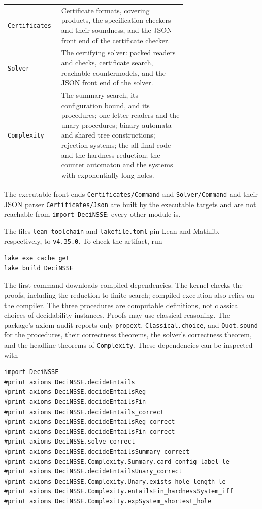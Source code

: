 \begin{center}
\begin{tabular}{@{}lp{0.70\linewidth}@{}}
\texttt{Certificates} & Certificate formats, covering products, the specification checkers and their soundness, and the JSON front end of the certificate checker.\\
\texttt{Solver} & The certifying solver: packed readers and checks, certificate search, reachable countermodels, and the JSON front end of the solver.\\
\texttt{Complexity} & The summary search, its configuration bound, and its procedures; one-letter readers and the unary procedures; binary automata and shared tree constructions; rejection systems; the all-final code and the hardness reduction; the counter automaton and the systems with exponentially long holes.\\\bottomrule
\end{tabular}
\end{center}
The executable front ends \texttt{Certificates/Command} and
\texttt{Solver/Command} and their JSON parser \texttt{Certificates/Json} are
built by the executable targets and are not reachable from
\texttt{import DeciNSSE}; every other module is.

The files \texttt{lean-toolchain} and \texttt{lakefile.toml} pin Lean and
Mathlib, respectively, to \texttt{v4.35.0}. To check the artifact, run
\begin{lstlisting}
lake exe cache get
lake build DeciNSSE
\end{lstlisting}
The first command downloads compiled dependencies. The kernel checks the
proofs, including the reduction to finite search; compiled execution also
relies on the compiler. The three procedures are computable definitions,
not classical choices of decidability instances. Proofs may use classical
reasoning. The package's axiom audit reports only \texttt{propext},
\texttt{Classical.choice}, and \texttt{Quot.sound} for the procedures,
their correctness theorems, the solver's correctness theorem, and the
headline theorems of \texttt{Complexity}. These dependencies can be inspected with
\begin{lstlisting}
import DeciNSSE
#print axioms DeciNSSE.decideEntails
#print axioms DeciNSSE.decideEntailsReg
#print axioms DeciNSSE.decideEntailsFin
#print axioms DeciNSSE.decideEntails_correct
#print axioms DeciNSSE.decideEntailsReg_correct
#print axioms DeciNSSE.decideEntailsFin_correct
#print axioms DeciNSSE.solve_correct
#print axioms DeciNSSE.decideEntailsSummary_correct
#print axioms DeciNSSE.Complexity.Summary.card_config_label_le
#print axioms DeciNSSE.decideEntailsUnary_correct
#print axioms DeciNSSE.Complexity.Unary.exists_hole_length_le
#print axioms DeciNSSE.Complexity.entailsFin_hardnessSystem_iff
#print axioms DeciNSSE.Complexity.expSystem_shortest_hole
\end{lstlisting}

